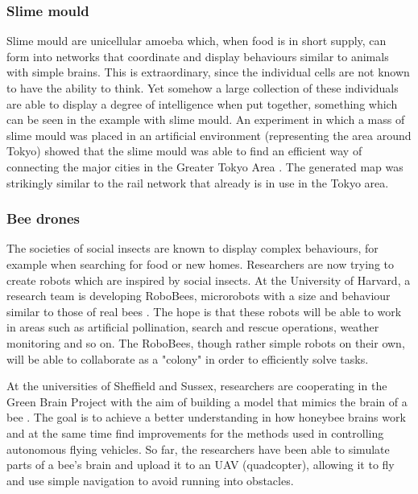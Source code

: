\documentclass[11pt]{article}
\begin{document}
\subsubsection*{Slime mould}

Slime mould are unicellular amoeba which, when food is in short supply, can form into networks that coordinate and display behaviours similar to animals with simple brains. This is extraordinary, since the individual cells are not known to have the ability to think. Yet somehow a large collection of these individuals are able to display a degree of intelligence when put together, something which can be seen in the example with slime mould. An experiment in which a mass of slime mould was placed in an artificial environment (representing the area around Tokyo) showed that the slime mould was able to find an efficient way of connecting the major cities in the Greater Tokyo Area \cite{tero2010rules}. The generated map was strikingly similar to the rail network that already is in use in the Tokyo area.

\subsubsection*{Bee drones}

The societies of social insects are known to display complex behaviours, for example when searching for food or new homes. Researchers are now trying to create robots which are inspired by social insects. At the University of Harvard, a research team is developing RoboBees, microrobots with a size and behaviour similar to those of real bees \cite{robobees2015}. The hope is that these robots will be able to work in areas such as artificial pollination, search and rescue operations, weather monitoring and so on. The RoboBees, though rather simple robots on their own, will be able to collaborate as a "colony" in order to efficiently solve tasks. 

At the universities of Sheffield and Sussex, researchers are cooperating in the Green Brain Project with the aim of building a model that mimics the brain of a bee \cite{greenbrain2015}. The goal is to achieve a better understanding in how honeybee brains work and at the same time find improvements for the methods used in controlling autonomous flying vehicles. So far, the researchers have been able to simulate parts of a bee's brain and upload it to an UAV (quadcopter), allowing it to fly and use simple navigation to avoid running into obstacles.
\end{document}
